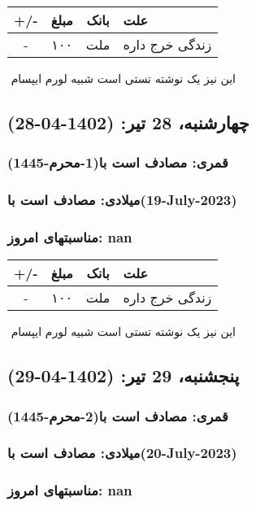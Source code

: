 \documentclass{article}
\newcommand{\rnote}[1]{\marginpar{\textcolor{color}{\StrSubstitute{\##1}{ }{\_}}}}
\newcommand{\myRow}[4]{
    #1 & #2 & #3 & #4 \\ \hline
}
\begin{document}
\begin{tabular}{ | c | c | c | p{5cm} |}
    \hline
    \myRow{ +/- }{مبلغ}{بانک}{علت}
    \myRow{-}{۱۰۰}{ملت}{زندگی خرج داره}
\end{tabular}
\newline
\newline

‌
\rnote{تست}
این نیز یک نوشته تستی است شبیه لورم ایپسام




\newpage
{}
\textcolor{color}{
\section{ چهارشنبه، 28 تیر: (1402-04-28) }
\subsubsection*{قمری: مصادف است با(1-محرم-1445)} 
\subsubsection*{میلادی: مصادف است با(19-July-2023)}
\subsubsection*{مناسبتهای امروز: nan}
}


\begin{tabular}{ | c | c | c | p{5cm} |}
    \hline
    \myRow{ +/- }{مبلغ}{بانک}{علت}
    \myRow{-}{۱۰۰}{ملت}{زندگی خرج داره}
\end{tabular}
\newline
\newline

‌
\rnote{تست}
این نیز یک نوشته تستی است شبیه لورم ایپسام




\newpage
{}
\textcolor{color}{
\section{ پنجشنبه، 29 تیر: (1402-04-29) }
\subsubsection*{قمری: مصادف است با(2-محرم-1445)} 
\subsubsection*{میلادی: مصادف است با(20-July-2023)}
\subsubsection*{مناسبتهای امروز: nan}
}
\end{document}
